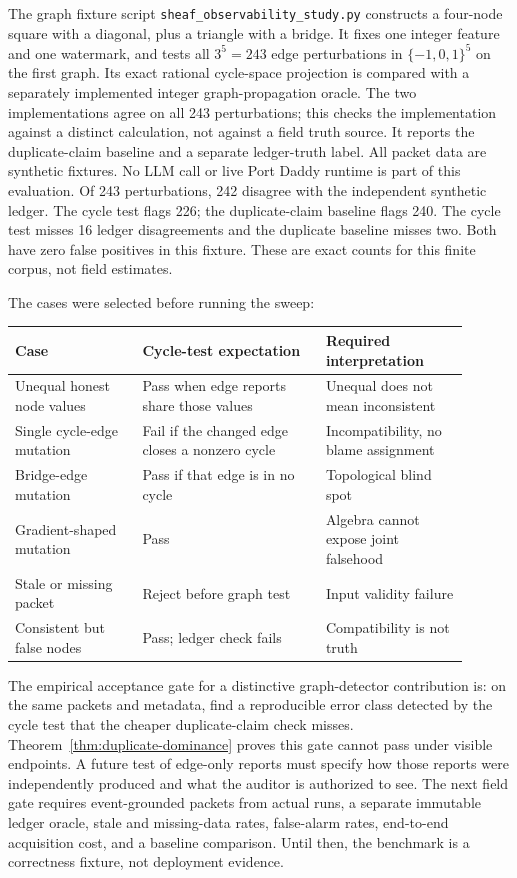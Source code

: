 \documentclass[11pt,a4paper]{article}
\begin{document}
The graph fixture script \texttt{sheaf\_observability\_study.py} constructs a four-node square with a diagonal, plus a triangle with a bridge. It fixes one integer feature and one watermark, and tests all $3^5=243$ edge perturbations in $\{-1,0,1\}^5$ on the first graph. Its exact rational cycle-space projection is compared with a separately implemented integer graph-propagation oracle. The two implementations agree on all 243 perturbations; this checks the implementation against a distinct calculation, not against a field truth source. It reports the duplicate-claim baseline and a separate ledger-truth label. All packet data are synthetic fixtures. No LLM call or live Port Daddy runtime is part of this evaluation. Of 243 perturbations, 242 disagree with the independent synthetic ledger. The cycle test flags 226; the duplicate-claim baseline flags 240. The cycle test misses 16 ledger disagreements and the duplicate baseline misses two. Both have zero false positives in this fixture. These are exact counts for this finite corpus, not field estimates.

The cases were selected before running the sweep:
\begin{center}
\begin{tabular}{p{0.25\linewidth}p{0.36\linewidth}p{0.29\linewidth}}
\toprule
Case & Cycle-test expectation & Required interpretation \\
\midrule
Unequal honest node values & Pass when edge reports share those values & Unequal does not mean inconsistent \\
Single cycle-edge mutation & Fail if the changed edge closes a nonzero cycle & Incompatibility, no blame assignment \\
Bridge-edge mutation & Pass if that edge is in no cycle & Topological blind spot \\
Gradient-shaped mutation & Pass & Algebra cannot expose joint falsehood \\
Stale or missing packet & Reject before graph test & Input validity failure \\
Consistent but false nodes & Pass; ledger check fails & Compatibility is not truth \\
\bottomrule
\end{tabular}
\end{center}

The empirical acceptance gate for a distinctive graph-detector contribution is: on the same packets and metadata, find a reproducible error class detected by the cycle test that the cheaper duplicate-claim check misses. Theorem~\ref{thm:duplicate-dominance} proves this gate cannot pass under visible endpoints. A future test of edge-only reports must specify how those reports were independently produced and what the auditor is authorized to see. The next field gate requires event-grounded packets from actual runs, a separate immutable ledger oracle, stale and missing-data rates, false-alarm rates, end-to-end acquisition cost, and a baseline comparison. Until then, the benchmark is a correctness fixture, not deployment evidence.
\end{document}
